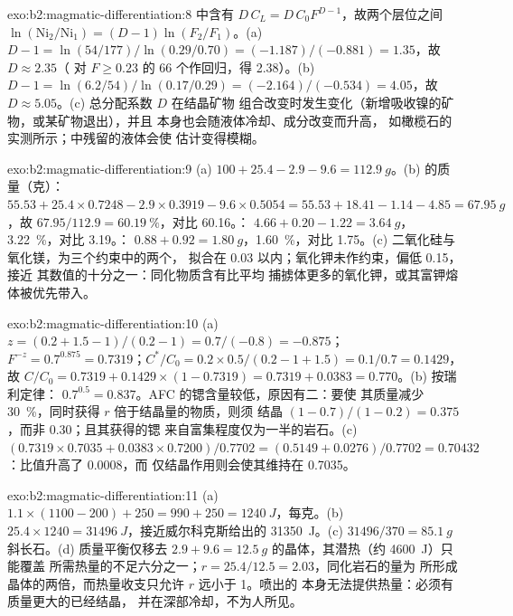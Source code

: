 \begin{solution}{exo:b2:magmatic-differentiation:8}
中含有 $D\,C_L = D\,C_0F^{D-1}$，故两个层位之间
$\ln(\mathrm{Ni}_2/\mathrm{Ni}_1) = (D - 1)\ln(F_2/F_1)$。(a) $D - 1 = \ln(54/177)/
\ln(0.29/0.70) = (-1.187)/(-0.881) = 1.35$，故 $D \approx 2.35$（
对 $F \ge 0.23$ 的 66 个作回归，得 2.38）。(b) $D - 1 = \ln(6.2/54)/\ln(0.17/0.29) = (-2.164)/(-0.534)
= 4.05$，故 $D \approx 5.05$。(c) 总分配系数 $D$ 在结晶矿物
组合改变时发生变化（新增吸收镍的矿物，或某矿物退出），并且
本身也会随液体冷却、成分改变而升高，
如橄榄石的实测所示；中残留的液体会使
估计变得模糊。
\end{solution}

\begin{solution}{exo:b2:magmatic-differentiation:9}
(a) $100 + 25.4 - 2.9 - 9.6 = \qty{112.9}{g}$。(b)  的质量（克）：$55.53 +
25.4\times0.7248 - 2.9\times0.3919 - 9.6\times0.5054 = 55.53 + 18.41 - 1.14 - 4.85 =
\qty{67.95}{g}$，故 $67.95/112.9 = \qty{60.19}{\percent}$，对比 60.16。：
$4.66 + 0.20 - 1.22 = \qty{3.64}{g}$，\qty{3.22}{\percent}，对比 3.19。：
$0.88 + 0.92 = \qty{1.80}{g}$，\qty{1.60}{\percent}，对比 1.75。(c) 二氧化硅与氧化镁，为三个约束中的两个，
拟合在 0.03 以内；氧化钾未作约束，偏低 0.15，接近
其数值的十分之一：同化物质含有比平均
捕掳体更多的氧化钾，或其富钾熔体被优先带入。
\end{solution}

\begin{solution}{exo:b2:magmatic-differentiation:10}
(a) $z = (0.2 + 1.5 - 1)/(0.2 - 1) = 0.7/(-0.8) = -0.875$；$F^{-z} = 0.7^{0.875} =
0.7319$；$C^*/C_0 = 0.2\times0.5/(0.2 - 1 + 1.5) = 0.1/0.7 = 0.1429$，故 $C/C_0 =
0.7319 + 0.1429\times(1 - 0.7319) = 0.7319 + 0.0383 = 0.770$。(b) 按瑞利定律：
$0.7^{0.5} = 0.837$。AFC 的锶含量较低，原因有二：要使
其质量减少 \qty{30}{\percent}，同时获得 $r$ 倍于结晶量的物质，则须
结晶 $(1 - 0.7)/(1 - 0.2) = 0.375$，而非 0.30；且其获得的锶
来自富集程度仅为一半的岩石。(c) $(0.7319\times0.7035 + 0.0383\times0.7200)/0.7702
= (0.5149 + 0.0276)/0.7702 = 0.70432$：比值升高了 0.0008，而
仅结晶作用则会使其维持在 0.7035。
\end{solution}

\begin{solution}{exo:b2:magmatic-differentiation:11}
(a) $1.1\times(1100 - 200) + 250 = 990 + 250 = \qty{1240}{J}$，每克。(b)
$25.4\times1240 = \qty{31496}{J}$，接近威尔科克斯给出的 \qty{31350}{J}。(c)
$31496/370 = \qty{85.1}{g}$ 斜长石。(d) 质量平衡仅移去 $2.9 +
9.6 = \qty{12.5}{g}$ 的晶体，其潜热（约 \qty{4600}{J}）只能覆盖
所需热量的不足六分之一；$r = 25.4/12.5 = 2.03$，同化岩石的量为
所形成晶体的两倍，而热量收支只允许 $r$ 远小于 1。喷出的
本身无法提供热量：必须有质量更大的已经结晶，
并在深部冷却，不为人所见。
\end{solution}

